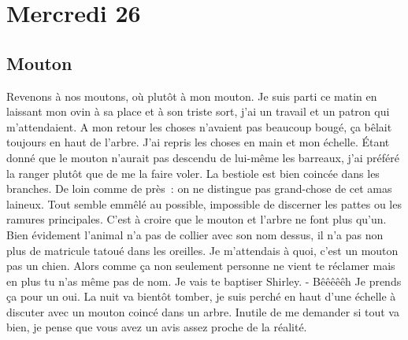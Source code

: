 ﻿\section*{Mercredi 26}
\subsection*{Mouton}
Revenons à nos moutons, où plutôt à mon mouton. 
Je suis parti ce matin en laissant mon ovin à sa place et à son triste sort, j’ai un travail et un patron qui m’attendaient. A mon retour les choses n’avaient pas beaucoup bougé, ça bêlait toujours en haut de l’arbre. J’ai repris les choses en main et mon échelle. Étant donné que le mouton n’aurait pas descendu de lui-même les barreaux, j’ai préféré la ranger plutôt que de me la faire voler. 
La bestiole est bien coincée dans les branches. De loin comme de près : on ne distingue pas grand-chose de cet amas laineux. Tout semble emmêlé au possible, impossible de discerner les pattes ou les ramures principales. C’est à croire que le mouton et l’arbre ne font plus qu’un. 
Bien évidement l’animal n’a pas de collier avec son nom dessus, il n’a pas non plus de matricule tatoué dans les oreilles. Je m’attendais à quoi, c’est un mouton pas un chien. Alors comme ça non seulement personne ne vient te réclamer mais en plus tu n’as même pas de nom. Je vais te baptiser Shirley.
- Bêêêêêh
Je prends ça pour un oui.
La nuit va bientôt tomber, je suis perché en haut d’une échelle à discuter avec un mouton coincé dans un arbre. Inutile de me demander si tout va bien, je pense que vous avez un avis assez proche de la réalité.
